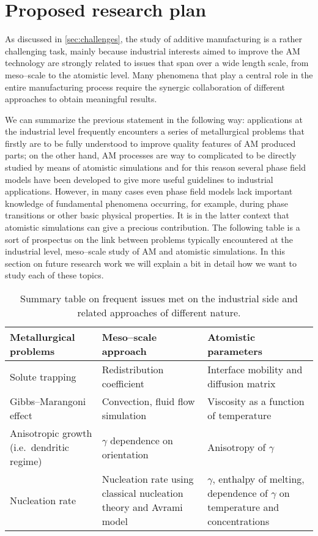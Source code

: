 \chapter{Proposed research plan}
As discussed in \cref{sec:challenges}, the study of additive manufacturing is a rather challenging task, mainly because industrial interests aimed to improve the AM technology are strongly related to issues that span over a wide length scale, from meso--scale to the atomistic level. Many phenomena that play a central role in the entire manufacturing process require the synergic collaboration of different approaches to obtain meaningful results.

We can summarize the previous statement in the following way: applications at the industrial level frequently encounters a series of metallurgical problems that firstly are to be fully understood to improve quality features of AM produced parts; on the other hand, AM processes are way to complicated to be directly studied by means of atomistic simulations and for this reason several phase field models have been developed to give more useful guidelines to industrial applications. However, in many cases even phase field models lack important knowledge of fundamental phenomena occurring, for example, during phase transitions or other basic physical properties. It is in the latter context that atomistic simulations can give a precious contribution. The following table is a sort of prospectus on the link between problems typically encountered at the industrial level, meso--scale study of AM and atomistic simulations. In this section on future research work we will explain a bit in detail how we want to study each of these topics.

\begin{table}[tb]
\centering
\caption{Summary table on frequent issues met on the industrial side and related approaches of different nature.}
\label{tab:modeling_roadmap}
\begin{tabularx}{\textwidth}{*{3}{X}}
\toprule
    \textbf{Metallurgical problems} & \textbf{Meso--scale approach} & \textbf{Atomistic parameters} \\
    \midrule
    Solute trapping & Redistribution coefficient & Interface mobility and diffusion matrix \\
    Gibbs--Marangoni effect & Convection, fluid flow simulation & Viscosity as a function of temperature\\
    Anisotropic growth (i.e.\ dendritic regime) & $\gamma$ dependence on orientation & Anisotropy of $\gamma$ \\
    Nucleation rate & Nucleation rate using classical nucleation theory and Avrami model & $\gamma$, enthalpy of melting, dependence of $\gamma$ on temperature and concentrations\\
    \bottomrule 
\end{tabularx}
\end{table}


